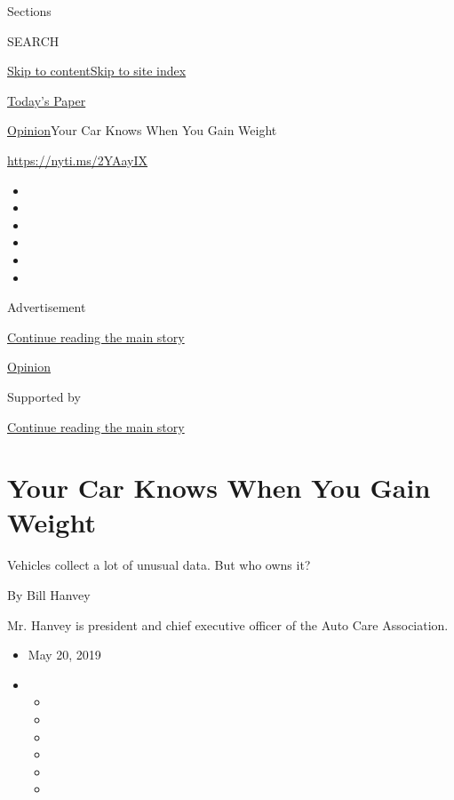 Sections

SEARCH

\protect\hyperlink{site-content}{Skip to
content}\protect\hyperlink{site-index}{Skip to site index}

\href{https://myaccount.nytimes.com/auth/login?response_type=cookie\&client_id=vi}{}

\href{https://www.nytimes.com/section/todayspaper}{Today's Paper}

\href{/section/opinion}{Opinion}\textbar{}Your Car Knows When You Gain
Weight

\url{https://nyti.ms/2YAayIX}

\begin{itemize}
\item
\item
\item
\item
\item
\item
\end{itemize}

Advertisement

\protect\hyperlink{after-top}{Continue reading the main story}

\href{/section/opinion}{Opinion}

Supported by

\protect\hyperlink{after-sponsor}{Continue reading the main story}

\hypertarget{your-car-knows-when-you-gain-weight}{%
\section{Your Car Knows When You Gain
Weight}\label{your-car-knows-when-you-gain-weight}}

Vehicles collect a lot of unusual data. But who owns it?

By Bill Hanvey

Mr. Hanvey is president and chief executive officer of the Auto Care
Association.

\begin{itemize}
\item
  May 20, 2019
\item
  \begin{itemize}
  \item
  \item
  \item
  \item
  \item
  \item
  \end{itemize}
\end{itemize}

